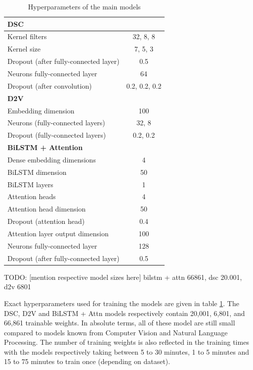 \begin{table}[h!]
	\centering
	\begin{tabular}{| l | c |} 
		\hline
		\textbf{DSC}\\
		\hline
		Kernel filters & 32, 8, 8 \\
		Kernel size & 7, 5, 3 \\
		Dropout (after fully-connected layer) & 0.5\\
		Neurons fully-connected layer & 64 \\
		Dropout (after convolution) & 0.2, 0.2, 0.2\\
		\hline
		\textbf{D2V}\\
		\hline
		Embedding dimension & 100\\
		Neurons (fully-connected layers) & 32, 8\\
		Dropout (fully-connected layers) & 0.2, 0.2\\
		\hline
		\textbf{BiLSTM + Attention} \\
		\hline
		Dense embedding dimensions & 4\\
		BiLSTM dimension & 50\\
		BiLSTM layers & 1\\
		Attention heads & 4\\
		Attention head dimension & 50\\
		Dropout (attention head) & 0.4 \\
		Attention layer output dimension & 100\\
		Neurons fully-connected layer & 128\\
		Dropout (after fully-connected layer) & 0.5\\
		\hline
	\end{tabular}
	\caption{Hyperparameters of the main models
	}
	\label{table:hyperparameters}
\end{table}

TODO: [mention respective model sizes here]
bilstm + attn 66861, dsc 20.001, d2v 6801

Exact hyperparameters used for training the models are given in table \ref{table:hyperparameters}.
The DSC, D2V and BiLSTM + Attn models respectively contain 20,001, 6,801, and 66,861 trainable weights. In absolute terms, all of these model are still small compared to models known from Computer Vision and Natural Language Processing. The number of training weights is also reflected in the training times with the models respectively taking between 5 to 30 minutes, 1 to 5 minutes and 15 to 75 minutes to train once (depending on dataset). 

 

